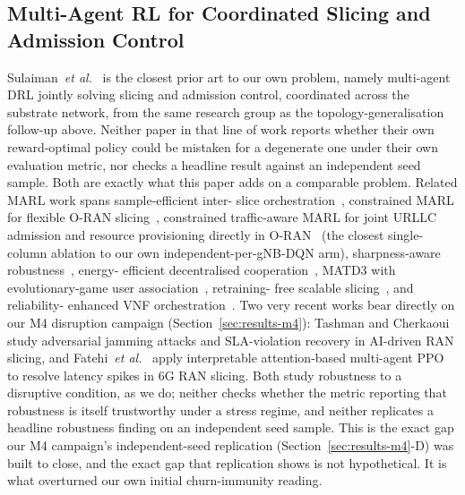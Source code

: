 \documentclass[journal]{IEEEtran}
\begin{document}
\subsection{Multi-Agent RL for Coordinated Slicing and Admission Control}
Sulaiman~\emph{et al.}~\cite{sulaiman2023coordinated} is the closest
prior art to our own problem, namely multi-agent DRL jointly solving
slicing and admission control, coordinated across the substrate network, from
the same research group as the topology-generalisation follow-up
above. Neither paper in that line of work reports whether their own
reward-optimal policy could be mistaken for a degenerate one under
their own evaluation metric, nor checks a headline result against an
independent seed sample. Both are exactly what this paper adds on a
comparable problem. Related MARL work spans sample-efficient inter-
slice orchestration~\cite{doanis2024samarl}, constrained MARL for
flexible O-RAN slicing~\cite{zangooei2024flexran}, constrained
traffic-aware MARL for joint URLLC admission and resource provisioning
directly in O-RAN~\cite{wu2025admissionmarl,wu2025slicewise} (the
closest single-column ablation to our own independent-per-gNB-DQN
arm), sharpness-aware robustness~\cite{lotfi2026sharpmarl}, energy-
efficient decentralised cooperation~\cite{phyu2025icecream}, MATD3 with
evolutionary-game user association~\cite{chen2025matd3}, retraining-
free scalable slicing~\cite{li2026scalablemarl}, and reliability-
enhanced VNF orchestration~\cite{wang2024madqnvnf}. Two very recent
works bear directly on our M4 disruption campaign
(Section~\ref{sec:results-m4}): Tashman and
Cherkaoui~\cite{tashman2026adversarial} study adversarial jamming
attacks and SLA-violation recovery in AI-driven RAN slicing, and
Fatehi~\emph{et al.}~\cite{fatehi2026attentionmarl} apply interpretable
attention-based multi-agent PPO to resolve latency spikes in 6G RAN
slicing. Both study robustness to a disruptive condition, as we do; neither
checks whether the metric reporting that robustness is itself
trustworthy under a stress regime, and neither replicates a headline
robustness finding on an independent seed sample. This is the exact gap our
M4 campaign's independent-seed replication (Section~\ref{sec:results-m4}-D)
was built to close, and the exact gap that replication shows is not
hypothetical. It is what overturned our own initial churn-immunity
reading.
\end{document}
